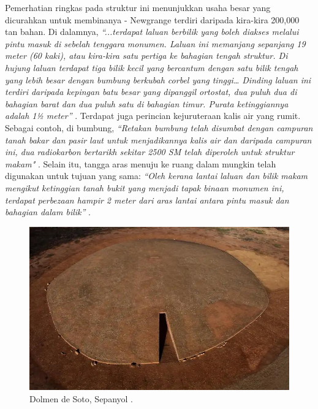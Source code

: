 \documentclass[10pt,twocolumn,letterpaper]{article}
\begin{document}
Pemerhatian ringkas pada struktur ini menunjukkan usaha besar yang dicurahkan untuk membinanya - Newgrange terdiri daripada kira-kira 200,000 tan bahan. Di dalamnya, \textit{“...terdapat laluan berbilik yang boleh diakses melalui pintu masuk di sebelah tenggara monumen. Laluan ini memanjang sepanjang 19 meter (60 kaki), atau kira-kira satu pertiga ke bahagian tengah struktur. Di hujung laluan terdapat tiga bilik kecil yang bercantum dengan satu bilik tengah yang lebih besar dengan bumbung berkubah corbel yang tinggi… Dinding laluan ini terdiri daripada kepingan batu besar yang dipanggil ortostat, dua puluh dua di bahagian barat dan dua puluh satu di bahagian timur. Purata ketinggiannya adalah 1½ meter”} \cite{70}. Terdapat juga perincian kejuruteraan kalis air yang rumit. Sebagai contoh, di bumbung, \textit{“Retakan bumbung telah disumbat dengan campuran tanah bakar dan pasir laut untuk menjadikannya kalis air dan daripada campuran ini, dua radiokarbon bertarikh sekitar 2500 SM telah diperoleh untuk struktur makam"} \cite{71}. Selain itu, tangga aras menuju ke ruang dalam mungkin telah digunakan untuk tujuan yang sama: \textit{“Oleh kerana lantai laluan dan bilik makam mengikut ketinggian tanah bukit yang menjadi tapak binaan monumen ini, terdapat perbezaan hampir 2 meter dari aras lantai antara pintu masuk dan bahagian dalam bilik”} \cite{71}.

\begin{figure}[t]

\begin{center}
   \includegraphics[width=1\linewidth]{dolmen.jpg}
\end{center}
   \caption{Dolmen de Soto, Sepanyol \cite{53}.}
\label{fig:9}
\label{fig:onecol}
\end{figure}
\end{document}

